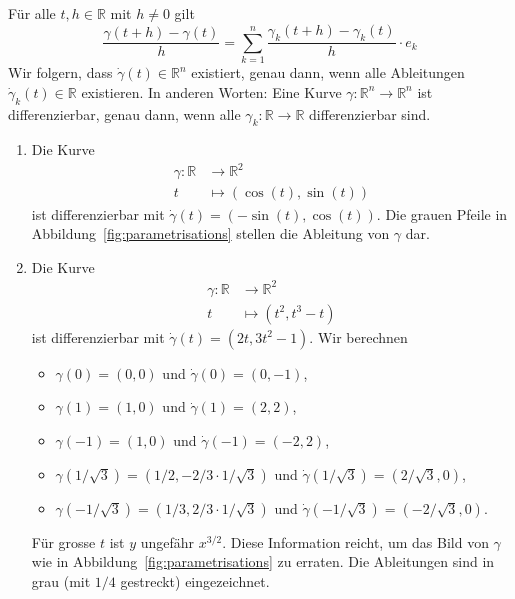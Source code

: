 \documentclass[../main.tex]{subfiles}
\begin{document}
\begin{remark}
  Für alle $t, h \in \mathbb{R}$ mit $h \neq 0$ 
  gilt
  \[
    \frac{\gamma(t + h) - \gamma(t)}{h}
    = \sum_{k=1}^{n} \frac{\gamma_k(t + h)- \gamma_k(t)}{h} \cdot e_k
  \]
  Wir folgern, dass $\dot{\gamma}(t) \in \mathbb{R}^n$ existiert,
  genau dann, wenn alle Ableitungen $\dot{\gamma}_k(t) \in \mathbb{R}$ 
  existieren.
  In anderen Worten: Eine Kurve $\gamma \colon \mathbb{R}^n \to \mathbb{R}^n$ 
  ist differenzierbar, genau dann, wenn alle $\gamma_k \colon \mathbb{R}
  \to \mathbb{R}$ differenzierbar sind.
\end{remark}

\begin{examples}
  \leavevmode
  \begin{enumerate}[(1)]
    \item Die Kurve
      \begin{align*}
        \gamma \colon \mathbb{R} & \to \mathbb{R}^2 \\
        t & \mapsto (\cos(t), \sin(t))
      \end{align*}
      ist differenzierbar mit $\dot{\gamma}(t) = (-\sin(t), \cos(t))$.
      Die grauen Pfeile in Abbildung~\ref{fig:parametrisations}
      stellen die Ableitung von $\gamma$ dar.
    \item Die Kurve
      \begin{align*}
        \gamma \colon \mathbb{R} & \to \mathbb{R}^2 \\
        t & \mapsto (t^2, t^3 - t)
      \end{align*}
      ist differenzierbar mit $\dot{\gamma}(t) = (2t, 3t^2 - 1)$.
      Wir berechnen
      \begin{itemize}
        \item $\gamma(0) = (0, 0)$ und $\dot{\gamma}(0) = (0, -1)$,
        \item $\gamma(1) = (1, 0)$ und $\dot{\gamma}(1) = (2, 2)$,
        \item $\gamma(-1) = (1, 0)$ und $\dot{\gamma}(-1) = (-2, 2)$,
        \item $\gamma(1/\sqrt{3}) = (1/2, -2/3 \cdot 1/\sqrt{3})$
          und $\dot \gamma (1/\sqrt{3}) = (2 / \sqrt 3, 0)$,
        \item $\gamma(-1 / \sqrt 3) = (1 / 3, 2/ 3 \cdot 1 / \sqrt 3)$
          und $\dot \gamma ( - 1 / \sqrt 3 ) = (- 2 / \sqrt 3, 0)$.
      \end{itemize}
     Für grosse $t$ ist $y$ ungefähr $x^{3/2}$. Diese Information reicht,
     um das Bild von $\gamma$ wie in Abbildung~\ref{fig:parametrisations}
     zu erraten.
     Die Ableitungen sind in grau (mit $1/4$ gestreckt) eingezeichnet.
  \end{enumerate}
\end{examples}
\end{document}
